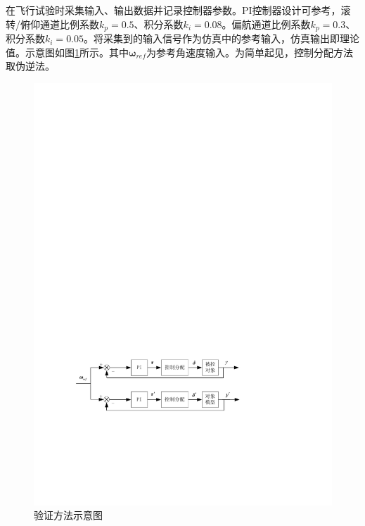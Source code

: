 在飞行试验时采集输入、输出数据并记录控制器参数。PI控制器设计可参考\cite{Peddle_2009}，滚转/俯仰通道比例系数$ k_p=0.5 $、积分系数$ k_i=0.08 $。偏航通道比例系数$ k_p=0.3 $、积分系数$ k_i=0.05 $。将采集到的输入信号作为仿真中的参考输入，仿真输出即理论值。示意图如图\ref{model_and_real}所示。其中$ \bm{\omega}_{ref} $为参考角速度输入。为简单起见，控制分配方法取伪逆法。
\begin{figure}[htbp]
	\centering	
	\includegraphics[scale=1]{Fig/model_and_real.pdf}
	\caption{\label{model_and_real}验证方法示意图}
\end{figure}

